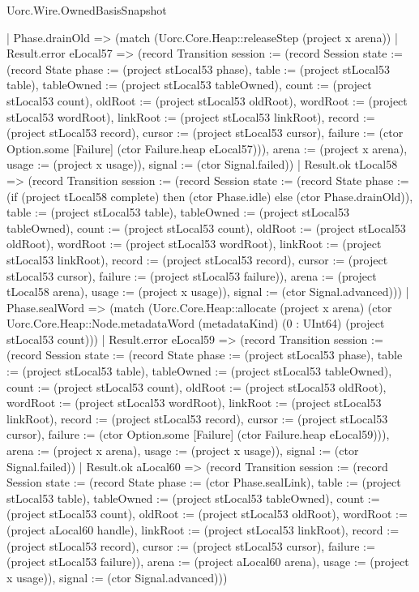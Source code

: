 \begin{lexlean}{Uorc.Wire.OwnedBasisSnapshot}
\begin{semanticmodule}
{      | Phase.drainOld => (match (Uorc.Core.Heap::releaseStep (project x arena))
        | Result.error eLocal57 => (record Transition {session := (record Session {state := (record State {phase := (project stLocal53 phase), table := (project stLocal53 table), tableOwned := (project stLocal53 tableOwned), count := (project stLocal53 count), oldRoot := (project stLocal53 oldRoot), wordRoot := (project stLocal53 wordRoot), linkRoot := (project stLocal53 linkRoot), record := (project stLocal53 record), cursor := (project stLocal53 cursor), failure := (ctor Option.some [Failure] (ctor Failure.heap eLocal57))}), arena := (project x arena), usage := (project x usage)}), signal := (ctor Signal.failed)})
        | Result.ok tLocal58 => (record Transition {session := (record Session {state := (record State {phase := (if (project tLocal58 complete) then (ctor Phase.idle) else (ctor Phase.drainOld)), table := (project stLocal53 table), tableOwned := (project stLocal53 tableOwned), count := (project stLocal53 count), oldRoot := (project stLocal53 oldRoot), wordRoot := (project stLocal53 wordRoot), linkRoot := (project stLocal53 linkRoot), record := (project stLocal53 record), cursor := (project stLocal53 cursor), failure := (project stLocal53 failure)}), arena := (project tLocal58 arena), usage := (project x usage)}), signal := (ctor Signal.advanced)}))
      | Phase.sealWord => (match (Uorc.Core.Heap::allocate (project x arena) (ctor Uorc.Core.Heap::Node.metadataWord (metadataKind) (0 : UInt64) (project stLocal53 count)))
        | Result.error eLocal59 => (record Transition {session := (record Session {state := (record State {phase := (project stLocal53 phase), table := (project stLocal53 table), tableOwned := (project stLocal53 tableOwned), count := (project stLocal53 count), oldRoot := (project stLocal53 oldRoot), wordRoot := (project stLocal53 wordRoot), linkRoot := (project stLocal53 linkRoot), record := (project stLocal53 record), cursor := (project stLocal53 cursor), failure := (ctor Option.some [Failure] (ctor Failure.heap eLocal59))}), arena := (project x arena), usage := (project x usage)}), signal := (ctor Signal.failed)})
        | Result.ok aLocal60 => (record Transition {session := (record Session {state := (record State {phase := (ctor Phase.sealLink), table := (project stLocal53 table), tableOwned := (project stLocal53 tableOwned), count := (project stLocal53 count), oldRoot := (project stLocal53 oldRoot), wordRoot := (project aLocal60 handle), linkRoot := (project stLocal53 linkRoot), record := (project stLocal53 record), cursor := (project stLocal53 cursor), failure := (project stLocal53 failure)}), arena := (project aLocal60 arena), usage := (project x usage)}), signal := (ctor Signal.advanced)}))
}
\end{semanticmodule}
\end{lexlean}
